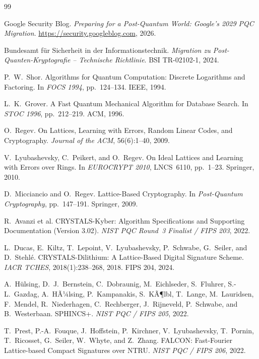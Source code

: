 ﻿\documentclass[a4paper,12pt]{article}
\theoremstyle{definition}
\begin{document}
\begin{thebibliography}{99}

Google Security Blog. \textit{Preparing for a Post-Quantum World: Google's 2029 PQC Migration}. \url{https://security.googleblog.com}, 2026.

Bundesamt f\"ur Sicherheit in der Informationstechnik. \textit{Migration zu Post-Quanten-Kryptografie -- Technische Richtlinie}. BSI TR-02102-1, 2024.

P.\ W.\ Shor. Algorithms for Quantum Computation: Discrete Logarithms and Factoring. In \textit{FOCS 1994}, pp.~124--134. IEEE, 1994.

L.\ K.\ Grover. A Fast Quantum Mechanical Algorithm for Database Search. In \textit{STOC 1996}, pp.~212--219. ACM, 1996.

O.\ Regev. On Lattices, Learning with Errors, Random Linear Codes, and Cryptography. \textit{Journal of the ACM}, 56(6):1--40, 2009.

V.\ Lyubashevsky, C.\ Peikert, and O.\ Regev. On Ideal Lattices and Learning with Errors over Rings. In \textit{EUROCRYPT 2010}, LNCS~6110, pp.~1--23. Springer, 2010.

D.\ Micciancio and O.\ Regev. Lattice-Based Cryptography. In \textit{Post-Quantum Cryptography}, pp.~147--191. Springer, 2009.

R.\ Avanzi et al. CRYSTALS-Kyber: Algorithm Specifications and Supporting Documentation (Version 3.02). \textit{NIST PQC Round~3 Finalist / FIPS 203}, 2022.

L.\ Ducas, E.\ Kiltz, T.\ Lepoint, V.\ Lyubashevsky, P.\ Schwabe, G.\ Seiler, and D.\ Stehl\'e. CRYSTALS-Dilithium: A Lattice-Based Digital Signature Scheme. \textit{IACR TCHES}, 2018(1):238--268, 2018. FIPS 204, 2024.

A.\ H\"ulsing, D.\ J.\ Bernstein, C.\ Dobraunig, M.\ Eichlseder, S.\ Fluhrer, S.-L.\ Gazdag, A.\ HÃ¼lsing, P.\ Kampanakis, S.\ KÃ¶lbl, T.\ Lange, M.\ Lauridsen, F.\ Mendel, R.\ Niederhagen, C.\ Rechberger, J.\ Rijneveld, P.\ Schwabe, and B.\ Westerbaan. SPHINCS+. \textit{NIST PQC / FIPS 205}, 2022.

T.\ Prest, P.-A.\ Fouque, J.\ Hoffstein, P.\ Kirchner, V.\ Lyubashevsky, T.\ Pornin, T.\ Ricosset, G.\ Seiler, W.\ Whyte, and Z.\ Zhang. FALCON: Fast-Fourier Lattice-based Compact Signatures over NTRU. \textit{NIST PQC / FIPS 206}, 2022.


\end{thebibliography}
\end{document}
